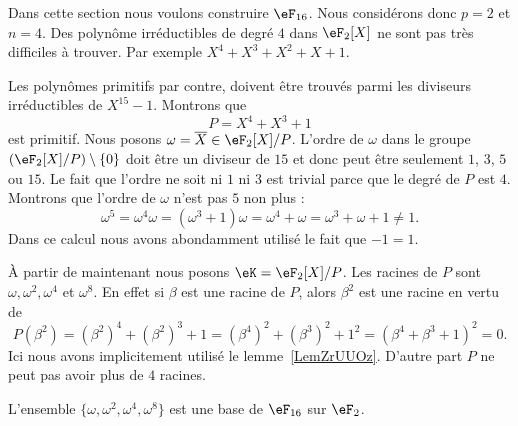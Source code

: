 Dans cette section nous voulons construire \( \eF_{16}\). Nous considérons donc \( p=2\) et \( n=4\). Des polynôme irréductibles de degré \( 4\) dans \( \eF_2[X]\) ne sont pas très difficiles à trouver. Par exemple \( X^4+X^3+X^2+X+1\).

Les polynômes primitifs par contre, doivent être trouvés parmi les diviseurs irréductibles de \( X^{15}-1\). Montrons que
\begin{equation}
	P=X^4+X^3+1
\end{equation}
est primitif. Nous posons \( \omega=\overline X\in \eF_2[X]/P\). L'ordre de \( \omega\) dans le groupe \( (\eF_2[X]/P)\setminus\{ 0 \} \) doit être un diviseur de \( 15\) et donc peut être seulement \( 1\), \( 3\), \( 5\) ou \( 15\). Le fait que l'ordre ne soit ni \( 1\) ni \( 3\) est trivial parce que le degré de \( P\) est \( 4\). Montrons que l'ordre de \( \omega\) n'est pas \( 5\) non plus :
\begin{equation}
	\omega^5=\omega^4\omega=(\omega^3+1)\omega=\omega^4+\omega=\omega^3+\omega+1\neq 1.
\end{equation}
Dans ce calcul nous avons abondamment utilisé le fait que \( -1=1\).

À partir de maintenant nous posons \( \eK=\eF_2[X]/P\). Les racines de \( P\) sont \( \omega,\omega^2,\omega^4\) et \( \omega^8\). En effet si \( \beta\) est une racine de \( P\), alors \( \beta^2\) est une racine en vertu de
\begin{equation}
	P(\beta^2)=(\beta^2)^4+(\beta^2)^3+1=(\beta^4)^2+(\beta^3)^2+1^2=(\beta^4+\beta^3+1)^2=0.
\end{equation}
Ici nous avons implicitement utilisé le lemme~\ref{LemZrUUOz}. D'autre part \( P\) ne peut pas avoir plus de \( 4\) racines.

\begin{proposition}
	L'ensemble \( \{ \omega,\omega^2,\omega^4,\omega^8 \}\) est une base de \( \eF_{16}\) sur \( \eF_2\).
\end{proposition}

